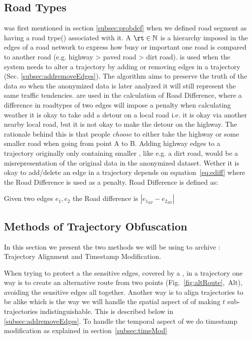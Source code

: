 \subsection{Road Types} \label{subsec:roadtypes}

\rt was first mentioned in section \ref{subsec:probdef} when we defined road segment as having a road type(\rt) associated with it. A $\rt \in \mathbb{N}$ is a hierarchy imposed in the edges of a road network to express how busy or important one road is compared to another road (e.g. highway > paved road > dirt road). \rt is used when the system needs to alter a trajectory by adding or removing edges in a trajectory (Sec. \ref{subsec:addremoveEdges}). 
The algorithm aims to preserve the truth of the data so when the anonymized data is later analyzed it will still represent the same traffic tendencies. \rts are used in the calculation of Road Difference, where a difference in roadtypes of two edges will impose a penalty when calculating weather it is okay to take add a detour on a local road i.e. it is okay via another nearby local road, but it is not okay to make the detour on the highway. The rationale behind this is that people {\it choose} to either take the highway or some smaller road when going from point A to B. Adding highway edges to a trajectory originally only containing smaller \rts , like e.g. a dirt road, would be a misrepresentation of the original data in the anonymized dataset. Wether it is okay to add/delete an edge in a trajectory depends on equation~\ref{eq:ediff} where the Road Difference is used as a penalty. Road Difference is defined as:

\begin{deff}
\label{def:roaddiff}
Given two edges \(e_1, e_2\) the Road difference is $| e_{1_{RT}} - e_{2_{RT}} |$
\end{deff}


\subsection{Methods of Trajectory Obfuscation}

In this section we present the two methods we will be using to archive \tanonns: Trajectory Alignment and Timestamp Modification.

When trying to protect a the sensitive edges, covered by a \poins, in a trajectory one way is to create an alternative route from two points (Fig.~\ref{fig:altRoute},~Alt), avoiding the sensitive edges all together. Another way is to align trajectories to be alike which is the way we will handle the spatial aspect of \tanon of making \(t\) sub-trajectories indistinguishable. This is described below in \ref{subsec:addremoveEdges}. To handle the temporal aspect of \tanon we do timestamp modification as explained in section~\ref{subsec:timeMod}


